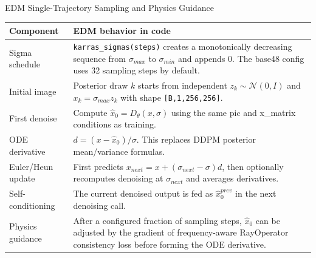\documentclass[10pt,landscape]{article}
\newcommand{\shape}[1]{\texttt{[#1]}}
\begin{document}
\begin{center}
{\Large EDM Single-Trajectory Sampling and Physics Guidance}
\end{center}

\small
\begin{tabular}{>{\raggedright\arraybackslash}p{48mm} >{\raggedright\arraybackslash}p{338mm}}
\toprule
Component & EDM behavior in code \\
\midrule
Sigma schedule & \texttt{karras\_sigmas(steps)} creates a monotonically decreasing sequence from $\sigma_{max}$ to $\sigma_{min}$ and appends 0. The base48 config uses 32 sampling steps by default. \\
Initial image & Posterior draw $k$ starts from independent $z_k\sim\mathcal{N}(0,I)$ and $x_k=\sigma_{max}z_k$ with shape \shape{B,1,256,256}. \\
First denoise & Compute $\hat{x}_0=D_\theta(x,\sigma)$ using the same pic and x\_matrix conditions as training. \\
ODE derivative & $d=(x-\hat{x}_0)/\sigma$. This replaces DDPM posterior mean/variance formulas. \\
Euler/Heun update & First predicts $x_{next}=x+(\sigma_{next}-\sigma)d$, then optionally recomputes denoising at $\sigma_{next}$ and averages derivatives. \\
Self-conditioning & The current denoised output is fed as $\hat{x}_0^{prev}$ in the next denoising call. \\
Physics guidance & After a configured fraction of sampling steps, $\hat{x}_0$ can be adjusted by the gradient of frequency-aware RayOperator consistency loss before forming the ODE derivative. \\
\bottomrule
\end{tabular}

\vspace{6mm}
\end{document}
